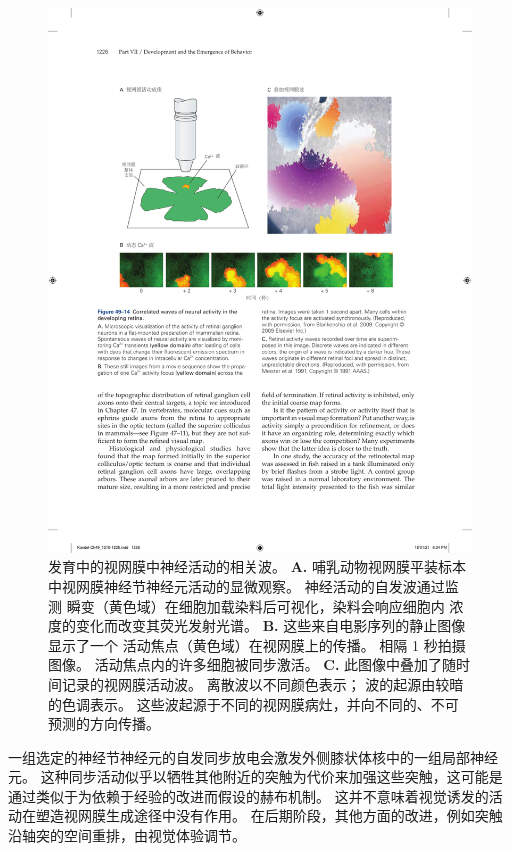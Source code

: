 \begin{figure}[htbp]
	\centering
	\includegraphics[width=1.0\linewidth]{chap49/fig_49_14}
	\caption{发育中的视网膜中神经活动的相关波。
		\textbf{A.} 哺乳动物视网膜平装标本中视网膜神经节神经元活动的显微观察。
		神经活动的自发波通过监测  瞬变（黄色域）在细胞加载染料后可视化，染料会响应细胞内  浓度的变化而改变其荧光发射光谱。
		\textbf{B.} 这些来自电影序列的静止图像显示了一个  活动焦点（黄色域）在视网膜上的传播。
		相隔 1 秒拍摄图像。
		活动焦点内的许多细胞被同步激活。
		\textbf{C.} 此图像中叠加了随时间记录的视网膜活动波。
		离散波以不同颜色表示；
		波的起源由较暗的色调表示。
		这些波起源于不同的视网膜病灶，并向不同的、不可预测的方向传播。}
	\label{fig:49_14}
\end{figure}


一组选定的神经节神经元的自发同步放电会激发外侧膝状体核中的一组局部神经元。
这种同步活动似乎以牺牲其他附近的突触为代价来加强这些突触，这可能是通过类似于为依赖于经验的改进而假设的赫布机制。
这并不意味着视觉诱发的活动在塑造视网膜生成途径中没有作用。
在后期阶段，其他方面的改进，例如突触沿轴突的空间重排，由视觉体验调节。


